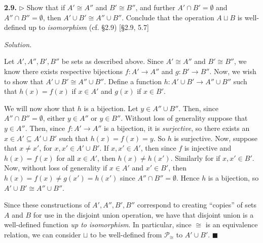 \documentclass[14pt,parskip=full]{scrartcl}
\newcommand{\exercise}[3]{
\noindent
\textbf{#1.} #2

\noindent
\textit{Solution.}{\let\tpar\par \let\par\relax #3}
}
\newcommand*{\QEDA}{\hfill\ensuremath{\blacksquare}}
\begin{document}
\exercise{2.9}{$\rhd$ Show that if $A'\cong A''$ and $B'\cong B''$, and further
$A'\cap B'=\emptyset$ and $A''\cap B''=\emptyset$, then $A'\cup B'\cong A''\cup
B''$. Conclude that the operation $A\sqcup B$ is well-defined up to
\textit{isomorphism} (cf. \S2.9) [\S2.9, 5.7]}{

Let $A',A'',B',B''$ be sets as described above. Since $A'\cong A''$ and $B'\cong
B''$, we know there exists respective bijections $f:A'\to A''$ and $g:B'\to
B''$. Now, we wish to show that $A'\cup B'\cong A''\cup B''$. Define a function
$h:A'\cup B'\to A''\cup B''$ such that $h(x) = f(x)$ if $x\in A'$ and $g(x)$ if
$x\in B'$.

\tpar
We will now show that $h$ is a bijection. Let $y\in A''\cup B''$. Then, since
$A''\cap B''=\emptyset$, either $y\in A''$ or $y\in B''$. Without loss of
generality suppose that $y\in A''$. Then, since $f:A'\to A''$ is a bijection, it
is \textit{surjective}, so there exists an $x\in A'\subseteq A'\cup B'$ such
that $h(x) = f(x) = y$. So $h$ is surjective. Now, suppose that $x\neq x'$, for
$x,x'\in A'\cup B'$. If $x,x'\in A'$, then since $f$ is injective and $h(x) =
f(x)$ for all $x\in A'$, then $h(x)\neq h(x')$. Similarly for if $x,x'\in B'$.
Now, without loss of generality if $x\in A'$ and $x'\in B'$, then $h(x) = f(x)
\neq g(x') = h(x')$ since $A''\cap B''=\emptyset$. Hence $h$ is a bijection, so
$A'\cup B'\cong A''\cup B''$.

\tpar
Since these constructions of $A',A'',B',B''$ correspond to creating ``copies''
of sets $A$ and $B$ for use in the disjoint union operation, we have that
disjoint union is a well-defined function \textit{up to isomorphism}. In
particular, since $\cong$ is an equivalence relation, we can consider $\sqcup$
to be well-defined from $\mathscr{P}_{\cong}$ to $A'\cup B'$.
\QEDA

}
\end{document}
